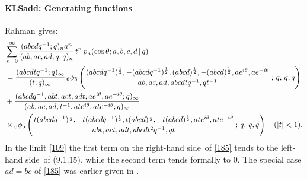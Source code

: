 \documentclass[envcountchap,graybox]{svmono}
\newcommand{\qhyp}[5]{\mbox{}_{#1}{\phi}_{#2}
\left(\genfrac{}{}{0pt}{}{#3}{#4}\,;\,q,\,#5\right)}
\newcommand\tha\theta
\newcommand\half{\frac12}
\newcommand\iy\infty
\newcommand{\qhyp}[5]{\,\mbox{}_{#1}\phi_{#2}\!\left(
  \genfrac{}{}{0pt}{}{#3}{#4};#5\right)}
\newcommand\LHS{left-hand side}
\newcommand\RHS{right-hand side}
\begin{document}
\paragraph{\large\bf KLSadd: Generating functions}Rahman  gives:
\begin{align}
&\sum_{n=0}^\iy \frac{(abcdq^{-1};q)_n a^n}{(ab,ac,ad,q;q)_n}\,t^n\,
p_n(\cos\tha;a,b,c,d\,|\,q)
\nonumber\\
&=\frac{(abcdtq^{-1};q)_\iy}{(t;q)_\iy}\,
\qhyp65{(abcdq^{-1})^\half,-(abcdq^{-1})^\half,(abcd)^\half,
-(abcd)^\half,a e^{i\tha},a e^{-i\tha}}
{ab,ac,ad,abcdtq^{-1},qt^{-1}}{q,q}
\nonumber\\
&+\frac{(abcdq^{-1},abt,act,adt,ae^{i\tha},ae^{-i\tha};q)_\iy}
{(ab,ac,ad,t^{-1},ate^{i\tha},ate^{-i\tha};q)_\iy}
\nonumber\\
&\times\qhyp65{t(abcdq^{-1})^\half,-t(abcdq^{-1})^\half,t(abcd)^\half,
-t(abcd)^\half,at e^{i\tha},at e^{-i\tha}}
{abt,act,adt,abcdt^2q^{-1},qt}{q,q}\quad(|t|<1).
\label{185}
\end{align}
In the limit \eqref{109} the first term on the \RHS\ of \eqref{185}
tends to the \LHS\ of (9.1.15), while the second term tends formally
to 0. The special case $ad=bc$ of \eqref{185} was earlier given in
.
%
\end{document}
